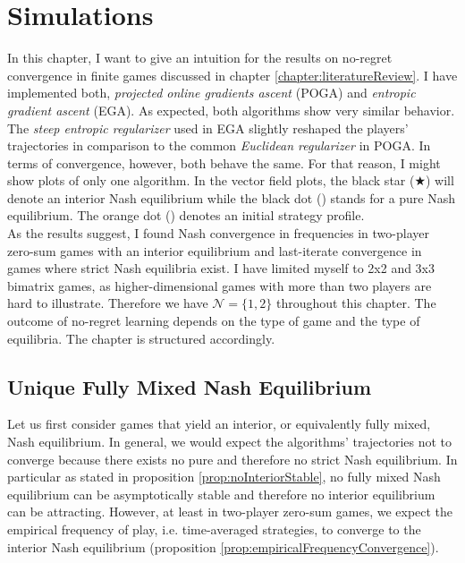 
\chapter{Simulations}\label{chapter:simulations}

In this chapter, I want to give an intuition for the results on no-regret convergence in finite games discussed in chapter \ref{chapter:literatureReview}. I have implemented both, \textit{projected online gradients ascent} (POGA) and \textit{entropic gradient ascent} (EGA). As expected, both algorithms show very similar behavior. The \textit{steep entropic regularizer} used in EGA slightly reshaped the players' trajectories in comparison to the common \textit{Euclidean regularizer} in POGA. In terms of convergence, however, both behave the same. For that reason, I might show plots of only one algorithm. In the vector field plots, the black star ($\bigstar$) will denote an interior Nash equilibrium while the black dot ({\Large\textbullet}) stands for a pure Nash equilibrium. The orange dot ({\color[HTML]{E37222}\Large\textbullet}) denotes an initial strategy profile. \\

As the results suggest, I found Nash convergence in frequencies in two-player zero-sum games with an interior equilibrium and last-iterate convergence in games where strict Nash equilibria exist. I have limited myself to 2x2 and 3x3 bimatrix games, as higher-dimensional games with more than two players are hard to illustrate. Therefore we have $\mathcal{N} = \{1,2\}$ throughout this chapter. The outcome of no-regret learning depends on the type of game and the type of equilibria. The chapter is structured accordingly. 

\section{Unique Fully Mixed Nash Equilibrium}\label{section:uniqueMixedNashEquilibrium}

Let us first consider games that yield an interior, or equivalently fully mixed, Nash equilibrium. In general, we would expect the algorithms' trajectories not to converge because there exists no pure and therefore no strict Nash equilibrium. In particular as stated in proposition \ref{prop:noInteriorStable}, no fully mixed Nash equilibrium can be asymptotically stable and therefore no interior equilibrium can be attracting. However, at least in two-player zero-sum games, we expect the empirical frequency of play, i.e. time-averaged strategies, to converge to the interior Nash equilibrium (proposition \ref{prop:empiricalFrequencyConvergence}).

